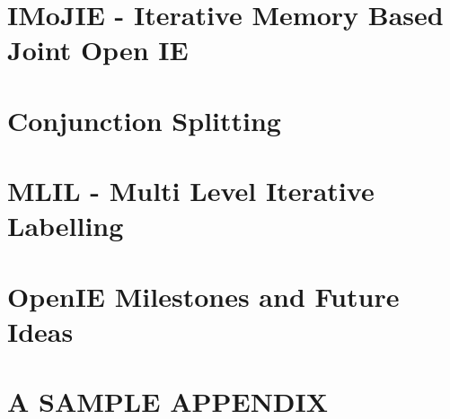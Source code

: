 \documentclass[BTech]{iitddiss}
\begin{document}

\chapter{IMoJIE - Iterative Memory Based Joint Open IE}
\label{chap:imojie}



\chapter{Conjunction Splitting}
\label{chap:conjunction_splitting}



\chapter{MLIL - Multi Level Iterative Labelling}
\label{chap:mlil}



\chapter{OpenIE Milestones and Future Ideas}
\label{chap:future_ideas}



\appendix

\chapter{A SAMPLE APPENDIX}



\begin{singlespace}
  
  
\end{singlespace}


% 
\end{document}
